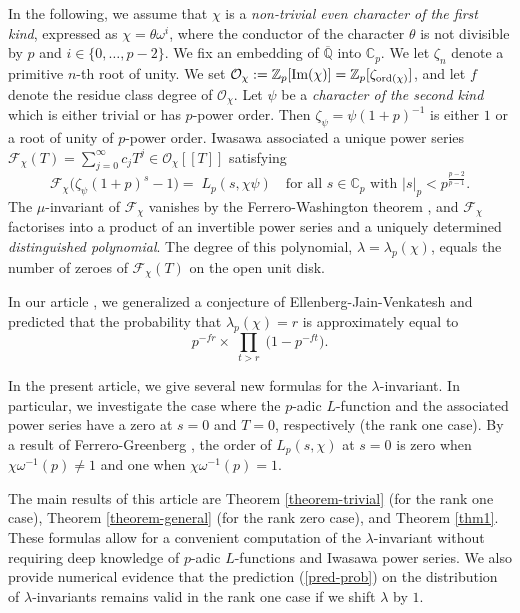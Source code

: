 \documentclass[pdflatex,sn-mathphys-num]{sn-jnl}%
\theoremstyle{plain}
\theoremstyle{definition}
\theoremstyle{remark}
\numberwithin{equation}{section}
\newcommand{\QQ}{\mathbb{Q}}
\newcommand{\Cp}{\mathbb{C}_p}
\newcommand{\Zp}{\mathbb{Z}_p}
\newcommand{\ord}{\text{\rm ord}}
\begin{document}
 
 In the following, we assume that $\chi$ is a {\em non-trivial even character of the first kind}, expressed as $\chi = \theta \omega^i$,
where the conductor of the character $\theta$ is not divisible by $p$ and $i \in \{0,\dots, p-2\}$. 
We fix an embedding of $\overline{\QQ}$ into $\Cp$.
We let $\zeta_n$ denote a primitive $n$-th root of unity.
We set $\mathcal{O}_{\chi}:=\Zp[\text{\rm Im}(\chi)] = \Zp[\zeta_{\ord(\chi)}]$, and let $f$ denote the residue class degree of $\mathcal{O}_{\chi}$.
Let $\psi$ be a {\em character of the second kind} which is either trivial or has $p$-power order. Then $\zeta_{\psi}= \psi(1+p)^{-1}$ is either $1$ or a root of unity of $p$-power order. 
Iwasawa associated a unique power series $\mathcal{F}_{\chi}(T) = \sum_{j=0}^{\infty} c_j T^j \in \mathcal{O}_{\chi}[\![T]\!]$ satisfying
\begin{equation}
\mathcal{F}_{\chi}\big(\zeta_{\psi} (1+ p)^{s} - 1\big) =\;
L_p(s, \chi \psi)
\quad\text{for all $s\in\Cp$ with $\big|s\big|_p\! <p^{\frac{p-2}{p-1}}$.}
\label{powerseries}
\end{equation}
The $\mu$-invariant of $\mathcal{F}_{\chi}$ vanishes by the Ferrero-Washington theorem \cite{FeWa}, and $\mathcal{F}_{\chi}$ factorises into a product of an invertible power series
and a uniquely determined {\em distinguished polynomial}. The degree of this polynomial,  $\lambda=\lambda_p(\chi)$, equals the number of zeroes of $\mathcal{F}_{\chi}(T)$ on the open unit disk.

In our article \cite{DeKn}, we generalized a conjecture of Ellenberg-Jain-Venkatesh \cite{EJV} and predicted that the probability  
 that $\lambda_p(\chi)=r$
is approximately equal to
\begin{equation}
p^{-fr}\times\;\prod_{t>r}\;\big(1-p^{-ft}\big).  \label{pred-prob}
\end{equation}


In the present article, we give several new formulas for the $\lambda$-invariant. In particular, we investigate the case where the $p$-adic $L$-function and the associated power series have a zero  at $s=0$ and $T=0$, respectively (the rank one case).
By a result of Ferrero-Greenberg \cite{FeGr}, the order of $L_p(s,\chi)$ at $s=0$ is zero when $\chi \omega^{-1}(p) \neq 1$ and one when $\chi \omega^{-1}(p) = 1$.

The main results of this article are Theorem \ref{theorem-trivial} (for the rank one case), Theorem \ref{theorem-general} (for the rank zero case), and Theorem \ref{thm1}. These formulas allow for a convenient computation of the $\lambda$-invariant without requiring deep knowledge of $p$-adic $L$-functions and Iwasawa power series.
We also provide numerical evidence that the prediction  (\ref{pred-prob}) on the distribution of $\lambda$-invariants remains valid in the rank one case if we shift $\lambda$ by $1$.
\end{document}
